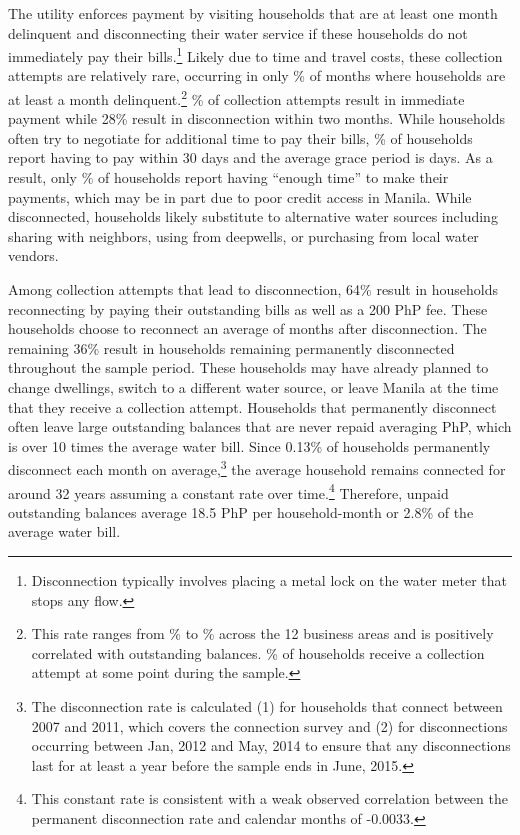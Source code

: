 \documentclass[12pt]{article}
\begin{document}
The utility enforces payment by visiting households that are at least one month delinquent and disconnecting their water service if these households do not immediately pay their bills.\footnote{Disconnection typically involves placing a metal lock on the water meter that stops any flow.}  Likely due to time and travel costs, these collection attempts are relatively rare, occurring in only \unskip\% of months where households are at least a month delinquent.\footnote{This rate ranges from \unskip\% to \unskip\% across the 12 business areas and is positively correlated with outstanding balances.  \unskip\% of households receive a collection attempt at some point during the sample.}  \unskip\% of collection attempts result in immediate payment while 28\% result in disconnection within two months.  While households often try to negotiate for additional time to pay their bills, \unskip\% of households report having to pay within 30 days and the average grace period is days.  As a result, only \unskip\% of households report having ``enough time'' to make their payments, which may be in part due to poor credit access in Manila.  While disconnected, households likely substitute to alternative water sources including sharing with neighbors, using from deepwells, or purchasing from local water vendors.  

Among collection attempts that lead to disconnection, 64\% result in households reconnecting by paying their outstanding bills as well as a 200 PhP fee.  These households choose to reconnect an average of months after disconnection.  The remaining 36\% result in households remaining permanently disconnected throughout the sample period. These households may have already planned to change dwellings, switch to a different water source, or leave Manila at the time that they receive a collection attempt.  Households that permanently disconnect often leave large outstanding balances that are never repaid averaging PhP, which is over 10 times the average water bill.  Since 0.13\% of households permanently disconnect each month on average,\footnote{The disconnection rate is calculated (1) for households that connect between 2007 and 2011, which covers the connection survey and (2) for disconnections occurring between Jan, 2012 and May, 2014 to ensure that any disconnections last for at least a year before the sample ends in June, 2015.} the average household remains connected for around 32 years assuming a constant rate over time.\footnote{This constant rate is consistent with a weak observed correlation between the permanent disconnection rate and calendar months of -0.0033.}  Therefore, unpaid outstanding balances average 18.5 PhP per household-month or 2.8\% of the average water bill.
\end{document}
